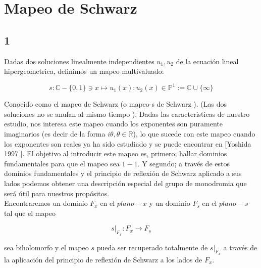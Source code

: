 \documentclass[11pt]{report}
\theoremstyle{definition}
\theoremstyle{remark}
\begin{document}
\chapter{Mapeo de Schwarz}

\section{1}

Dadas dos soluciones linealmente independientes $u_{1},u_{2}$ de la ecuaci\'on lineal hipergeometrica, definimos un mapeo multivaluado:

$$s: \mathbb{C}-\lbrace 0,1\rbrace \ni x \longmapsto u_{1}(x):u_{2}(x) \in \mathbb{P}^{1} := \mathbb{C} \cup \lbrace \infty \rbrace $$

Conocido como el mapeo de Schwarz (o mapeo-s de Schwarz ). (Las dos soluciones no se anulan al mismo tiempo ). Dadas las caracteristicas de nuestro estudio, nos interesa este mapeo cuando los exponentes son puramente imaginarios (es decir de la forma $i \theta, \theta \in \mathbb{R} $), lo que sucede con este mapeo cuando los exponentes son reales ya ha sido estudiado y se puede encontrar en [Yoshida 1997 ]. El objetivo al introducir este mapeo es, primero; hallar dominios fundamentales para que el mapeo sea $1-1$. Y segundo; a trav\'es de estos dominios fundamentales y el principio de reflexi\'on de Schwarz aplicado a sus lados podemos obtener una descripci\'on especial del grupo de monodromia que ser\'a \'util para nuestros prop\'ositos. \\ 

Encontraremos un dominio $F_{x}$ en el $plano-x$ y un dominio $F_{s}$ en el $plano-s$ tal que el mapeo 

$$s|_{F_{x}}:F_{x} \rightarrow F_{s} $$ 

sea biholomorfo y el mapeo $s$ pueda ser recuperado totalmente de $ s|_{F_{x}} $ a trav\'es de la aplicaci\'on del principio de reflexi\'on de Schwarz  a los lados de $F_{x}$.
\end{document}
